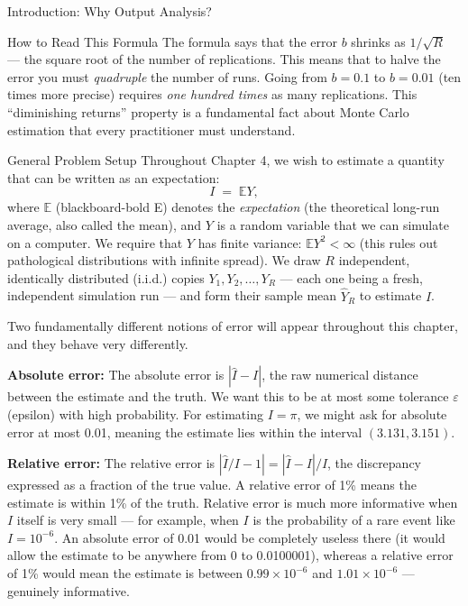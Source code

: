 \documentclass[aspectratio=169,10pt]{beamer}
\begin{document}
\begin{frame}[allowframebreaks]{Introduction: Why Output Analysis?}
\begin{alertblock}{How to Read This Formula}
  The formula says that the error $b$ shrinks as $1/\sqrt{R}$ --- the
  square root of the number of replications.  This means that to halve
  the error you must \emph{quadruple} the number of runs.  Going from
  $b = 0.1$ to $b = 0.01$ (ten times more precise) requires
  \emph{one hundred times} as many replications.  This
  ``diminishing returns'' property is a fundamental fact about Monte
  Carlo estimation that every practitioner must understand.
\end{alertblock}

\framebreak

\begin{block}{General Problem Setup}
  Throughout Chapter 4, we wish to estimate a quantity that can be
  written as an expectation:
  \[
    I \;=\; \mathbb{E}Y,
  \]
  where $\mathbb{E}$ (blackboard-bold E) denotes the \emph{expectation}
  (the theoretical long-run average, also called the mean), and $Y$ is a
  random variable that we can simulate on a computer.  We require that
  $Y$ has finite variance: $\mathbb{E}Y^2 < \infty$ (this rules out
  pathological distributions with infinite spread).  We draw $R$
  independent, identically distributed (i.i.d.) copies $Y_1, Y_2, \ldots,
  Y_R$ --- each one being a fresh, independent simulation run --- and
  form their sample mean $\hat{Y}_R$ to estimate $I$.
\end{block}

Two fundamentally different notions of error will appear throughout this
chapter, and they behave very differently.

\textbf{Absolute error:} The absolute error is $|\hat{I} - I|$, the raw
numerical distance between the estimate and the truth.  We want this to
be at most some tolerance $\varepsilon$ (epsilon) with high probability.
For estimating $I = \pi$, we might ask for absolute error at most 0.01,
meaning the estimate lies within the interval $(3.131, 3.151)$.

\textbf{Relative error:} The relative error is $|\hat{I}/I - 1| =
|\hat{I} - I|/I$, the discrepancy expressed as a fraction of the true
value.  A relative error of 1\% means the estimate is within 1\% of the
truth.  Relative error is much more informative when $I$ itself is very
small --- for example, when $I$ is the probability of a rare event like
$I = 10^{-6}$.  An absolute error of 0.01 would be completely useless
there (it would allow the estimate to be anywhere from 0 to 0.0100001),
whereas a relative error of 1\% would mean the estimate is between
$0.99 \times 10^{-6}$ and $1.01 \times 10^{-6}$ --- genuinely informative.


\end{frame}
\end{document}
